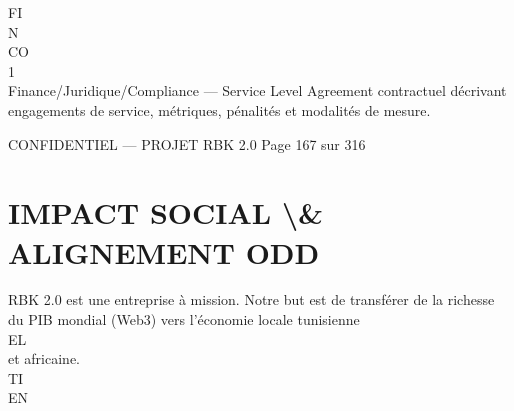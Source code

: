 FI\\
N\\
CO\\
\vspace{0.5em}
\vspace{0.5em}
\vspace{0.5em}
\vspace{0.5em}
1\\
Finance/Juridique/Compliance — Service Level Agreement contractuel décrivant engagements de service, métriques, pénalités et modalités de mesure.\\
\vspace{0.5em}
\vspace{0.5em}
\begin{confidential}CONFIDENTIEL — PROJET RBK 2.0                                          Page 167 sur 316\end{confidential}
\section{IMPACT SOCIAL \textbackslash{}& ALIGNEMENT ODD}
\vspace{0.5em}
\vspace{0.5em}
RBK 2.0 est une entreprise à mission. Notre but est de transférer de la richesse du PIB mondial (Web3) vers l’économie locale tunisienne\\
\vspace{0.5em}
\vspace{0.5em}
\vspace{0.5em}
\vspace{0.5em}
EL\\
et africaine.\\
\vspace{0.5em}
\vspace{0.5em}
\vspace{0.5em}
\vspace{0.5em}
TI\\
EN\\
